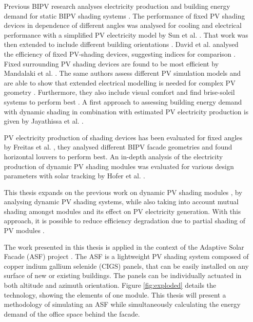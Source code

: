 	Previous BIPV research analyses electricity production and building energy demand for static BIPV shading systems \cite{sun2010, sun2012, David2011, mandalaki2012assessment, Mandalaki2014complexPV, mandalaki2014assessment, yoo2011available, jayathissa2015abs}. The performance of fixed PV shading devices in dependence of different angles was analysed for cooling and electrical performance with a simplified PV electricity model by Sun et al. \cite{sun2010}. That work was then extended to include different building orientations \cite{sun2012} . David et al. analysed the efficiency of fixed PV-shading devices, suggesting indices for comparison \cite{David2011}. Fixed surrounding PV shading devices are found to be most efficient by Mandalaki et al. \cite{mandalaki2012assessment}. The same authors assess different PV simulation models and are able to show that extended electrical modelling is needed for complex PV geometry \cite{Mandalaki2014complexPV}. Furthermore, they also include visual comfort and find brise-soleil systems to perform best \cite{mandalaki2014assessment}. A first approach to assessing building energy demand with dynamic shading in combination with estimated PV electricity production is given by Jayathissa et al. \cite{jayathissa2015abs}. 

	PV electricity production of shading devices has been evaluated for fixed angles by Freitas et al. \cite{freitas2015maximizing}, they analysed different BIPV facade geometries and found horizontal louvers to perform best. An in-depth analysis of the electricity production of dynamic PV shading modules was evaluated for various design parameters with solar tracking by Hofer et al. \cite{hofer2016}. 

	This thesis expands on the previous work on dynamic PV shading modules \cite{jayathissa2015abs, hofer2016}, by analysing dynamic PV shading systems, while also taking into account mutual shading amongst modules and its effect on PV electricity generation. With this approach, it is possible to reduce efficiency degradation due to partial shading of PV modules \cite{hofer2016}.

	The work presented in this thesis is applied in the context of the Adaptive Solar Facade (ASF) project \cite{nagy2016}. The ASF is a lightweight PV shading system composed of copper indium gallium selenide (CIGS) panels, that can be easily installed on any surface of new or existing buildings. The panels can be individually actuated in both altitude and azimuth orientation. Figure \ref{fig:exploded} details the technology, showing the elements of one module. This thesis will present a methodology of simulating an ASF while simultaneously calculating the energy demand of the office space behind the facade.


